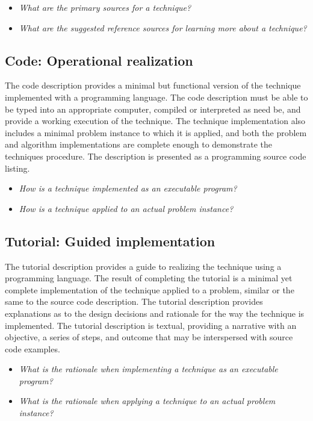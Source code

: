 \documentclass[a4paper, 11pt]{article}
\begin{document}
\begin{itemize}
	\item \emph{What are the primary sources for a technique?}
	\item \emph{What are the suggested reference sources for learning more about a technique?}
\end{itemize}

\subsection{Code: Operational realization}
The code description provides a minimal but functional version of the technique implemented with a programming language. The code description must be able to be typed into an appropriate computer, compiled or interpreted as need be, and provide a working execution of the technique. The technique implementation also includes a minimal problem instance to which it is applied, and both the problem and algorithm implementations are complete enough to demonstrate the techniques procedure. The description is presented as a programming source code listing.

\begin{itemize}
	\item \emph{How is a technique implemented as an executable program?}
	\item \emph{How is a technique applied to an actual problem instance?}
\end{itemize}

\subsection{Tutorial: Guided implementation}
The tutorial description provides a guide to realizing the technique using a programming language. The result of completing the tutorial is a minimal yet complete implementation of the technique applied to a problem, similar or the same to the source code description. The tutorial description provides explanations as to the design decisions and rationale for the way the technique is implemented. The tutorial description is textual, providing a narrative with an objective, a series of steps, and outcome that may be interspersed with source code examples.

\begin{itemize}
	\item \emph{What is the rationale when implementing a technique as an executable program?}
	\item \emph{What is the rationale when applying a technique to an actual problem instance?}
\end{itemize}
\end{document}
